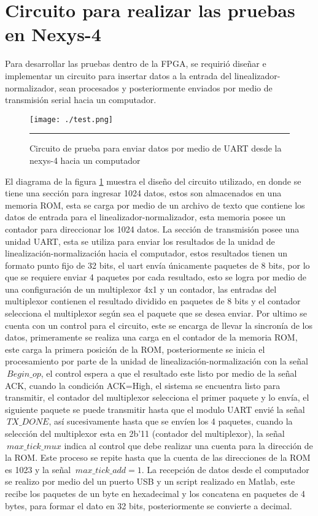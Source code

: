 \section{Circuito para realizar las pruebas en Nexys-4}

Para desarrollar las pruebas dentro de la FPGA, se requirió diseñar e implementar un circuito para insertar datos a la entrada del linealizador-normalizador, sean procesados y posteriormente enviados por medio de transmisión serial hacia un computador.  

\begin{figure}[H]
  \centering
    \texttt{[image: ./test.png]}
    \rule{35em}{0.5pt}
  \caption[Circuito de prueba para enviar datos por medio de UART desde la nexys-4 hacia un computador]{Circuito de prueba para enviar datos por medio de UART desde la nexys-4 hacia un computador}
  \label{fig:test}
\end{figure}

El diagrama de la figura \ref{fig:test} muestra el diseño del circuito utilizado, en donde se tiene una sección para ingresar 1024 datos, estos son almacenados en una memoria ROM, esta se carga por medio de un archivo de texto que contiene los datos de entrada para el linealizador-normalizador, esta memoria posee un contador para direccionar los 1024 datos. La sección de transmisión posee una unidad UART, esta se utiliza para enviar los resultados de la unidad de linealización-normalización hacia el computador, estos resultados tienen un formato punto fijo de 32 bits, el uart envía únicamente paquetes de 8 bits, por lo que se requiere enviar 4 paquetes por cada resultado, esto se logra por medio de una configuración de un multiplexor 4x1 y un contador, las entradas del multiplexor contienen el resultado dividido en paquetes de 8 bits y el contador selecciona el multiplexor según sea el paquete que se desea enviar. Por ultimo se cuenta con un control para el circuito, este se encarga de llevar la sincronía de los datos, primeramente se realiza una carga en el contador de la memoria ROM, este carga la primera posición de la ROM, posteriormente se inicia el procesamiento por parte de la unidad de linealización-normalización con la señal $\ Begin\_op$, el control espera a que el resultado este listo por medio de la señal ACK, cuando la condición ACK=High, el sistema se encuentra listo para transmitir, el contador del multiplexor selecciona el primer paquete y lo envía, el siguiente paquete se puede transmitir hasta que el modulo UART envié la señal $\ TX\_DONE$, así sucesivamente hasta que se envíen los 4 paquetes, cuando la selección del multiplexor esta en 2b'11 (contador del multiplexor), la señal $\ max\_tick\_mux$ indica al control que debe realizar una cuenta para la dirección de la ROM. Este proceso se repite hasta que la cuenta de las direcciones de la ROM es 1023 y la señal $\ max\_tick\_add = 1 $.
La recepción de datos desde el computador se realizo por medio del un puerto USB y un script realizado en Matlab, este recibe los paquetes de un byte en hexadecimal y los concatena en paquetes de 4 bytes, para formar el dato en 32 bits, posteriormente se convierte a decimal.   


